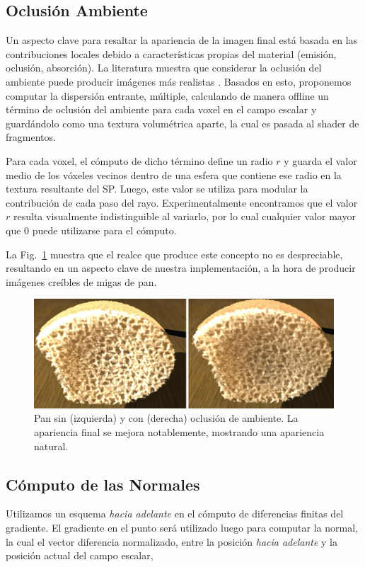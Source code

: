 \subsection{Oclusión Ambiente}

Un aspecto clave para resaltar la apariencia de la imagen final está basada en las contribuciones locales debido a características propias del material (emisión, oclusión, absorción).
La literatura muestra que considerar la oclusión del ambiente puede producir imágenes más realistas \cite{Hernell2010}.
Basados en esto, proponemos computar la dispersión entrante, múltiple, calculando de manera offline un término de oclusión del ambiente para cada voxel en el campo escalar y guardándolo como una textura volumétrica aparte, la cual es pasada al shader de fragmentos.

Para cada voxel, el cómputo de dicho término define un radio $r$ y guarda el valor medio de los vóxeles vecinos dentro de una esfera que contiene ese radio en la textura resultante del SP.
Luego, este valor se utiliza para modular la contribución de cada paso del rayo.
Experimentalmente encontramos que el valor $r$ resulta visualmente indistinguible al variarlo, por lo cual cualquier valor mayor que $0$ puede utilizarse para el cómputo.

La Fig.~\ref{fg:occlusion} muestra que el realce que produce este concepto no es despreciable, resultando en un aspecto clave de nuestra implementación, a la hora de producir imágenes creíbles de migas de pan. 



\begin{figure}
\centerline{\includegraphics[width=13cm]{figures/occlusion}}
  \caption[Pan renderizado sin y con oclusión de ambiente]{Pan sin (izquierda) y con (derecha) oclusión de ambiente. La apariencia final se mejora notablemente, mostrando una apariencia natural.}
  \label{fg:occlusion}
\end{figure}
 
\subsection{Cómputo de las Normales}
Utilizamos un esquema {\em hacia adelante} en el cómputo de diferencias finitas del gradiente.
El gradiente en el punto será utilizado luego para computar la normal, la cual el vector diferencia normalizado, entre la posición {\em hacia adelante} y la posición actual del campo escalar,



